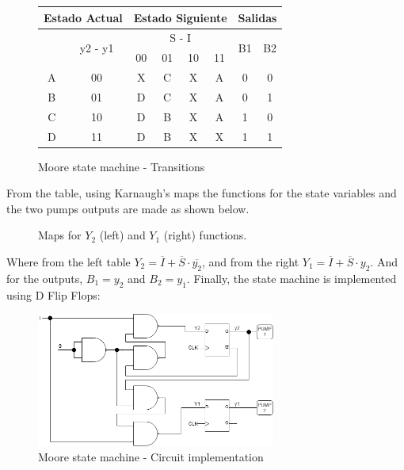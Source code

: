 \begin{figure}[H]
\begin{centering}
\begin{tabular}{|c|c|c|c|c|c||c|c|}
    \hline 
    \multicolumn{2}{|c|}{Estado Actual} & \multicolumn{4}{c||}{Estado Siguiente} & \multicolumn{2}{c|}{Salidas}\tabularnewline
    \hline 
    \hline 
    \multirow{2}{*}{} & \multirow{2}{*}{y2 - y1} & \multicolumn{4}{c||}{S - I} & \multirow{2}{*}{B1} & \multirow{2}{*}{B2}\tabularnewline
    \cline{3-6} 
     &  & 00 & 01 & 10 & 11 &  & \tabularnewline
    \hline 
    A & 00 & X & C & X & A & 0 & 0\tabularnewline
    \hline 
    B & 01 & D & C & X & A & 0 & 1\tabularnewline
    \hline 
    C & 10 & D & B & X & A & 1 & 0\tabularnewline
    \hline 
    D & 11 & D & B & X & X & 1 & 1\tabularnewline
    \hline 
    \end{tabular}
    \caption{Moore state machine - Transitions}
\end{centering}
\end{figure}

\newpage

From the table, using Karnaugh's maps the 
functions for the state variables and the 
two pumps outputs are made as shown below.

\begin{figure}[H]
\begin{center}
\begin{Karnaugh}
\end{Karnaugh}
\begin{Karnaugh}
\end{Karnaugh}
\caption{Maps for $Y_2$ (left) and $Y_1$ (right) functions.}
\end{center}
\end{figure}

Where from the left table $Y_2 = \overline{I} + \overline{S} \cdot \overline{y_2}$, 
and from the right $Y_1 = \overline{I} + \overline{S} \cdot y_2$. And for
the outputs, $B_1 = y_2$ and $B_2 = y_1$.  
Finally, the state machine is implemented using 
D Flip Flops:

\begin{figure}[H]
    \begin{centering}
    \includegraphics[width=0.7\textwidth]{data/Graficos1/1a_Compuertas_Moore.png}
    \par\end{centering}
    \caption{Moore state machine - Circuit implementation}
\end{figure}

